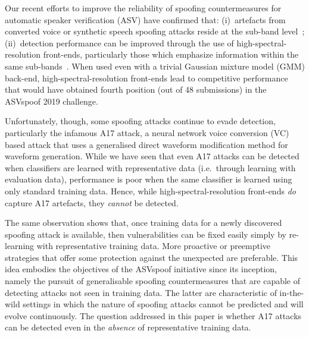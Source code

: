 Our recent efforts to improve the reliability of spoofing countermeasures for automatic speaker verification (ASV) have confirmed that: (i)~artefacts from converted voice or synthetic speech spoofing attacks reside at the sub-band level~\cite{odyssey2020CQCC}; (ii)~detection performance can be improved through the use of high-spectral-resolution front-ends, particularly those which emphasize information within the same sub-bands~\cite{IS2020LFCC}. When used even with a trivial Gaussian mixture model (GMM) back-end, high-spectral-resolution front-ends lead to competitive performance that would have obtained fourth position (out of 48 submissions) in the ASVspoof 2019 challenge. 

Unfortunately, though, some spoofing attacks continue to evade detection, particularly the infamous A17 attack, a neural network voice conversion (VC) based attack that uses a generalised direct waveform modification method for waveform generation. 
While we have seen that even A17 attacks can be detected when classifiers are learned with representative data (i.e.\ through learning with evaluation data), performance is poor when the same classifier is learned using only standard training data. Hence, while high-spectral-resolution front-ends \emph{do} capture A17 artefacts, they \emph{cannot} be detected.

The same observation shows that, once training data for a newly discovered spoofing attack is available, then vulnerabilities can be fixed easily simply by re-learning with representative training data. 
More proactive or preemptive strategies that offer some protection against the unexpected are preferable. This idea embodies the objectives of the ASVspoof initiative since its inception, namely the pursuit of generalisable spoofing countermeasures that are capable of detecting attacks not seen in training data. The latter are characteristic of in-the-wild settings in which the nature of spoofing attacks cannot be predicted and will evolve continuously. The question addressed in this paper is whether A17 attacks can be detected even in the \emph{absence} of representative training data.

